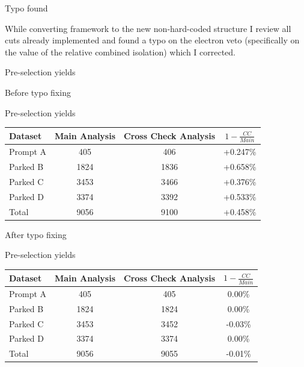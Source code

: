 \documentclass[8pt]{beamer}
\begin{document}
\begin{frame}{Typo found}

While converting framework to the new non-hard-coded structure I review all cuts already implemented and found a typo on the electron veto (specifically on the value of the relative combined isolation) which I corrected.
 
\begin{block}{Pre-selection yields}
 
\centering
\resizebox{1.0\linewidth}{!}{

}

\end{block}

\end{frame}



\begin{frame}{Before typo fixing}
 
\begin{block}{Pre-selection yields}

\centering
\begin{tabular}{|l|c|c|c|}
\hline
Dataset & Main Analysis & Cross Check Analysis & $1-\frac{CC}{Main}$ \\ 
\hline \hline
Prompt A &  405 &  406 & +0.247\% \\
Parked B & 1824 & 1836 & +0.658\% \\
Parked C & 3453 & 3466 & +0.376\% \\
Parked D & 3374 & 3392 & +0.533\% \\
\hline \hline
Total & 9056 & 9100 & +0.458\% \\
\hline
\end{tabular}

\end{block}

\end{frame}

\begin{frame}{After typo fixing}
 
\begin{block}{Pre-selection yields}

\centering
\begin{tabular}{|l|c|c|c|}
\hline
Dataset & Main Analysis & Cross Check Analysis & $1-\frac{CC}{Main}$ \\ 
\hline \hline
Prompt A &  405 &  405 &  0.00\% \\
Parked B & 1824 & 1824 &  0.00\% \\
Parked C & 3453 & 3452 & -0.03\% \\
Parked D & 3374 & 3374 &  0.00\% \\
\hline \hline
Total & 9056 & 9055 & -0.01\% \\
\hline
\end{tabular}

\end{block}

\end{frame}
\end{document}
